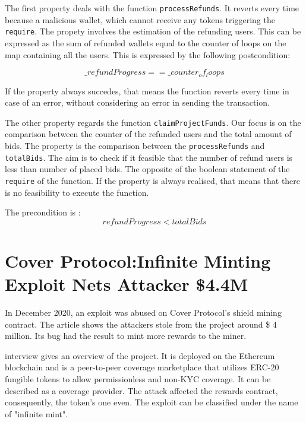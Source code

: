 The first property deals with the function \texttt{processRefunds}. 
It reverts every time because a malicious wallet, which cannot receive 
any tokens triggering the \texttt{require}. 
The propety involves the estimation of the refunding users.
This can be expressed as the sum of refunded wallets equal to the counter of loops on the map containing all the users. 
This is expressed by the following postcondition:

\begin{equation}
      \_refundProgress==\_counter_of_loops
\end{equation}

If the property always succedes, that means the function reverts every time in case of an error, without considering an error in sending the transaction.


The other property regards the function \texttt{claimProjectFunds}. 
Our focus is on the comparison between the counter of the refunded users and the total amount of bids.
The property is the comparison between the \texttt{processRefunds} and \texttt{totalBids}. 
The aim is to check if it feasible that the number of refund users is less than number of placed bids. 
The opposite of the boolean statement of the \texttt{require} of the function. 
If the property is always realised, that means that there is no feasibility to execute the function. 

The precondition is : 
\begin{equation}
    refundProgress < totalBids
\end{equation}

\section{Cover Protocol:Infinite Minting Exploit Nets Attacker \$4.4M }
\label{sec:Exploits:CoverProtocol}
In December 2020, an exploit was abused on Cover Protocol's shield 
mining contract. 
The article shows the attackers stole from the project around \$ 4 million. 
Its bug had the result to mint more rewards to the miner. 

\citet{CoverProtocol} interview gives an overview of the project. 
It is deployed on the Ethereum blockchain and is a peer-to-peer coverage marketplace that utilizes ERC-20 fungible tokens to allow permissionless and non-KYC coverage. 
It can be described as a coverage provider.
The attack affected the rewards contract, consequently, the token's one even.  
The exploit can be classified under the name of "infinite mint".


